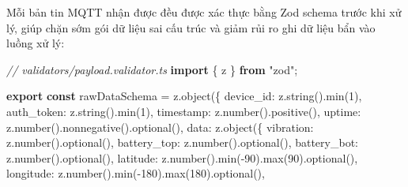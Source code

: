 \documentclass[a4paper]{extarticle}
\newenvironment{Shaded}{}{}
\newcommand{\CommentTok}[1]{\textcolor[rgb]{0.38,0.63,0.69}{\textit{#1}}}
\newcommand{\DecValTok}[1]{\textcolor[rgb]{0.25,0.63,0.44}{#1}}
\newcommand{\FunctionTok}[1]{\textcolor[rgb]{0.02,0.16,0.49}{#1}}
\newcommand{\ImportTok}[1]{\textcolor[rgb]{0.00,0.50,0.00}{\textbf{#1}}}
\newcommand{\KeywordTok}[1]{\textcolor[rgb]{0.00,0.44,0.13}{\textbf{#1}}}
\newcommand{\NormalTok}[1]{#1}
\newcommand{\OperatorTok}[1]{\textcolor[rgb]{0.40,0.40,0.40}{#1}}
\newcommand{\StringTok}[1]{\textcolor[rgb]{0.25,0.44,0.63}{#1}}
\begin{document}
Mỗi bản tin MQTT nhận được đều được xác thực bằng Zod schema trước khi
xử lý, giúp chặn sớm gói dữ liệu sai cấu trúc và giảm rủi ro ghi dữ liệu bẩn
vào luồng xử lý:

\begin{Shaded}
\begin{Highlighting}[]
\CommentTok{// validators/payload.validator.ts}
\ImportTok{import}\NormalTok{ \{ z \} }\ImportTok{from} \StringTok{"zod"}\OperatorTok{;}

\ImportTok{export} \KeywordTok{const}\NormalTok{ rawDataSchema }\OperatorTok{=}\NormalTok{ z}\OperatorTok{.}\FunctionTok{object}\NormalTok{(\{}
\NormalTok{  device\_id}\OperatorTok{:}\NormalTok{ z}\OperatorTok{.}\FunctionTok{string}\NormalTok{()}\OperatorTok{.}\FunctionTok{min}\NormalTok{(}\DecValTok{1}\NormalTok{)}\OperatorTok{,}
\NormalTok{  auth\_token}\OperatorTok{:}\NormalTok{ z}\OperatorTok{.}\FunctionTok{string}\NormalTok{()}\OperatorTok{.}\FunctionTok{min}\NormalTok{(}\DecValTok{1}\NormalTok{)}\OperatorTok{,}
\NormalTok{  timestamp}\OperatorTok{:}\NormalTok{ z}\OperatorTok{.}\FunctionTok{number}\NormalTok{()}\OperatorTok{.}\FunctionTok{positive}\NormalTok{()}\OperatorTok{,}
\NormalTok{  uptime}\OperatorTok{:}\NormalTok{ z}\OperatorTok{.}\FunctionTok{number}\NormalTok{()}\OperatorTok{.}\FunctionTok{nonnegative}\NormalTok{()}\OperatorTok{.}\FunctionTok{optional}\NormalTok{()}\OperatorTok{,}
\NormalTok{  data}\OperatorTok{:}\NormalTok{ z}\OperatorTok{.}\FunctionTok{object}\NormalTok{(\{}
\NormalTok{    vibration}\OperatorTok{:}\NormalTok{ z}\OperatorTok{.}\FunctionTok{number}\NormalTok{()}\OperatorTok{.}\FunctionTok{optional}\NormalTok{()}\OperatorTok{,}
\NormalTok{    battery\_top}\OperatorTok{:}\NormalTok{ z}\OperatorTok{.}\FunctionTok{number}\NormalTok{()}\OperatorTok{.}\FunctionTok{optional}\NormalTok{()}\OperatorTok{,}
\NormalTok{    battery\_bot}\OperatorTok{:}\NormalTok{ z}\OperatorTok{.}\FunctionTok{number}\NormalTok{()}\OperatorTok{.}\FunctionTok{optional}\NormalTok{()}\OperatorTok{,}
\NormalTok{    latitude}\OperatorTok{:}\NormalTok{ z}\OperatorTok{.}\FunctionTok{number}\NormalTok{()}\OperatorTok{.}\FunctionTok{min}\NormalTok{(}\OperatorTok{{-}}\DecValTok{90}\NormalTok{)}\OperatorTok{.}\FunctionTok{max}\NormalTok{(}\DecValTok{90}\NormalTok{)}\OperatorTok{.}\FunctionTok{optional}\NormalTok{()}\OperatorTok{,}
\NormalTok{    longitude}\OperatorTok{:}\NormalTok{ z}\OperatorTok{.}\FunctionTok{number}\NormalTok{()}\OperatorTok{.}\FunctionTok{min}\NormalTok{(}\OperatorTok{{-}}\DecValTok{180}\NormalTok{)}\OperatorTok{.}\FunctionTok{max}\NormalTok{(}\DecValTok{180}\NormalTok{)}\OperatorTok{.}\FunctionTok{optional}\NormalTok{()}\OperatorTok{,}

\end{Highlighting}
\end{Shaded}
\end{document}
